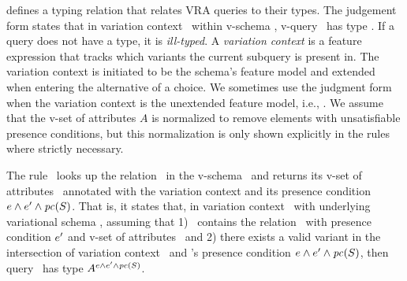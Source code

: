  defines a typing relation that relates VRA queries to
their types.
%
The judgement form \env{\vQ}{\envInContext[\VVal{\vctx}]{\vType}} states that
in variation context \vctx\ within v-schema \vSch, v-query \vQ\ has type
\envInContext[\VVal{\vctx}]{\vType}. 
%
If a query does not have a type, it is \emph{ill-typed}.
%
A \emph{variation context} is a feature expression that tracks which variants
the current subquery is present in. The variation context is initiated to be
the schema's feature model and extended when entering the alternative of a choice.
%
We sometimes use the judgment form \envWithoutVctx{\vQ}{\envInContext[\VVal{\vctx}]{\vType}}
when the variation context is the unextended feature model, i.e., 
\env[\getPC{\vSch}]{\vQ}{\envInContext[\VVal{\vctx}]{\vType}}.
%
We assume that the v-set of attributes $A$ is normalized to remove elements
with unsatisfiable presence conditions, but this normalization is only shown
explicitly in the rules where strictly necessary.

 

The rule \relationE\ looks up the relation \vRel\ in the 
v-schema \vSch\ and returns its v-set of attributes \vAttList\ annotated
with the variation context and its presence condition $\vctx \wedge \VVal \dimMeta \wedge \getPC \vSch$. 
%
That is, it states that, in variation context \vctx\ with
underlying variational schema \vSch, assuming that
1) \vSch\ contains
the relation \vRel\ with presence condition $\VVal \dimMeta$
and v-set of attributes \vType\ 
and
2) there exists a valid variant in the intersection of variation context \vctx\
and \vRel's presence condition \ensuremath{\dimMeta \wedge \VVal \dimMeta \wedge \getPC \vSch},
then query \vRel\ has type \ensuremath {\annot [\vctx \wedge \VVal \dimMeta \wedge \getPC \vSch] \vType}.

